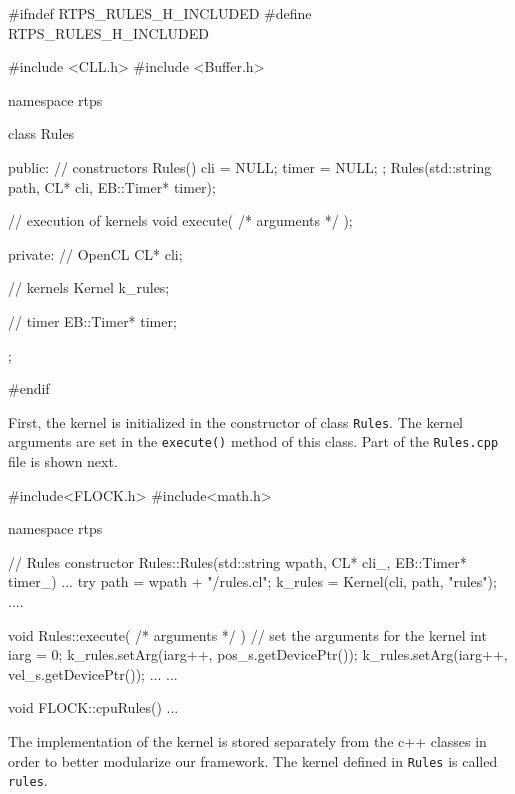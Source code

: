 \begin{cppcode}{0}
#ifndef RTPS_RULES_H_INCLUDED
#define RTPS_RULES_H_INCLUDED

#include <CLL.h>
 #include <Buffer.h>

namespace rtps
 {
	class Rules
	{
		public:
			// constructors
			Rules() { cli = NULL; timer = NULL; };
			Rules(std::string path, CL* cli, EB::Timer* timer);
			
			// execution of kernels
			void execute( /* arguments */ );
			
		private:
			// OpenCL
			CL* cli;
			
			// kernels
			Kernel k_rules;
			
			// timer
			EB::Timer* timer;
	};
}
#endif
\end{cppcode}

First, the kernel is initialized in the constructor of class \texttt{Rules}. The kernel 
arguments are set in the \texttt{execute()} method of this class. 
Part of the \texttt{Rules.cpp} file is shown next.

\begin{cppcode}{0}
#include<FLOCK.h>
#include<math.h>

namespace rtps
{
	// Rules constructor
	Rules::Rules(std::string wpath, CL* cli_, EB::Timer* timer_)
	{
		...
		try
		{
			path = wpath + "/rules.cl";
			k_rules = Kernel(cli, path, "rules");
		}
		....
	}

	void Rules::execute( /* arguments */ )
	{
		// set the arguments for the kernel
		int iarg = 0;
		k_rules.setArg(iarg++, pos_s.getDevicePtr());
		k_rules.setArg(iarg++, vel_s.getDevicePtr());
		...
	}
	...
	
	void FLOCK::cpuRules()
	{
		...
	}
}
\end{cppcode}

The implementation of the kernel is stored separately from the c++ classes in order to better 
modularize our framework. 
The kernel defined in \texttt{Rules} is called \texttt{rules}. 

